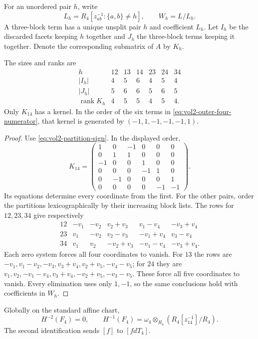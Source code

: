 For an unordered pair $h$, write
\[
 L_h=R_4[z_{ab}^{-1}:\{a,b\}\ne h],\qquad W_h=L/L_h.
\]
A three-block term has a unique unsplit pair $h$ and coefficient
$L_h$. Let $I_h$ be the discarded facets keeping $h$ together
and $J_h$ the three-block terms keeping it together. Denote the
corresponding submatrix of $A$ by $K_h$.

\begin{lemma}\label{lem:vol2-four-pair-ranks}
The sizes and ranks are
\[
 \begin{array}{c|rrrrrr}
 h&12&13&14&23&24&34\\\hline
 |I_h|&4&5&6&4&5&4\\
 |J_h|&5&6&6&5&6&5\\
 \operatorname{rank}K_h&4&5&5&4&5&4.
 \end{array}
\]
Only $K_{14}$ has a kernel. In the order of the six terms in
\eqref{eq:vol2-outer-four-numerator}, that kernel is generated by
$(-1,1,-1,-1,-1,1)$.
\end{lemma}

\begin{proof}
Use \eqref{eq:vol2-partition-sign}. In the displayed order,
\[
 K_{14}=\begin{pmatrix}
 1&0&-1&0&0&0\\0&1&1&0&0&0\\-1&0&0&1&0&0\\
 0&0&0&-1&1&0\\0&-1&0&0&0&1\\0&0&0&0&-1&-1
 \end{pmatrix}.
\]
Its equations determine every coordinate from the first. For
the other pairs, order the partitions lexicographically by
their increasing block lists. The rows for $12,23,34$ give
respectively
\[
 \begin{array}{c|ccccc}
 12&-v_1&-v_2&v_2+v_3&v_1-v_4&-v_3+v_4\\
 23&v_1&-v_2&v_2-v_3&-v_1+v_4&v_3-v_4\\
 34&v_1&v_2&-v_2+v_3&-v_1-v_4&-v_3+v_4.
 \end{array}
\]
Each zero system forces all four coordinates to vanish. For
$13$ the rows are
$-v_1,v_1-v_2,-v_3,v_3+v_4,v_2+v_5,-v_4-v_5$;
for $24$ they are
$v_1,v_2,-v_1-v_4,v_3+v_4,-v_2+v_5,-v_3-v_5$.
These force all five coordinates to vanish. Every elimination
uses only $1,-1$, so the same conclusions hold with coefficients
in $W_h$.
\end{proof}

\begin{theorem}\label{thm:vol2-four-outer-cohomology}
Globally on the standard affine chart,
\[
 H^{-2}(F_4)=0,\qquad
 H^{-1}(F_4)=\omega_4\otimes_{R_4}
                    (R_4[z_{14}^{-1}]/R_4).
\]
The second identification sends $[f]$ to $[fdT_4]$.
\end{theorem}

